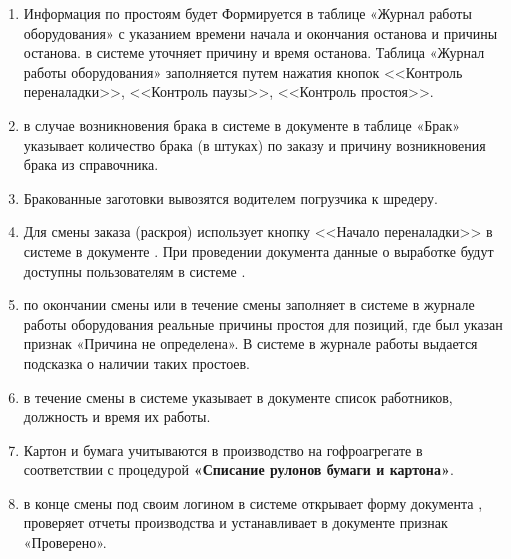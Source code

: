 \begin{enumerate}
\item	Информация по простоям будет Формируется в таблице «Журнал работы оборудования» с указанием времени начала и окончания останова и причины останова. \gaoperator в системе \gofro уточняет причину и время останова. Таблица «Журнал работы оборудования» заполняется \gaoperator путем нажатия кнопок <<Контроль переналадки>>, <<Контроль паузы>>, <<Контроль простоя>>.
\item	\gaoperator в случае возникновения брака  в системе \gofro в документе  в таблице «Брак» указывает количество брака (в штуках) по заказу и причину возникновения брака из справочника.
\item Бракованные заготовки вывозятся водителем погрузчика к шредеру.
\item	Для смены заказа (раскроя) \gaoperator использует кнопку <<Начало переналадки>> в системе \gofro в документе . При проведении документа данные о выработке будут доступны пользователям в системе \gofro. 
\item	\gaoperator по окончании смены или в течение смены заполняет в системе \gofro в журнале работы оборудования реальные причины простоя для позиций, где был указан признак «Причина не определена». В системе \gofro в журнале работы выдается подсказка о наличии таких простоев.
    
    

    
    \item  \gaoperator в течение смены в системе \gofro указывает в документе  список работников, должность и время их работы.
    \item	Картон и бумага учитываются в производство на гофроагрегате в соответствии с процедурой \textbf{«Списание рулонов бумаги и картона»}.
    \item \master в конце смены под своим логином в системе \gofro открывает форму документа ,  проверяет отчеты производства и устанавливает в документе признак «Проверено». 
    

\end{enumerate}
